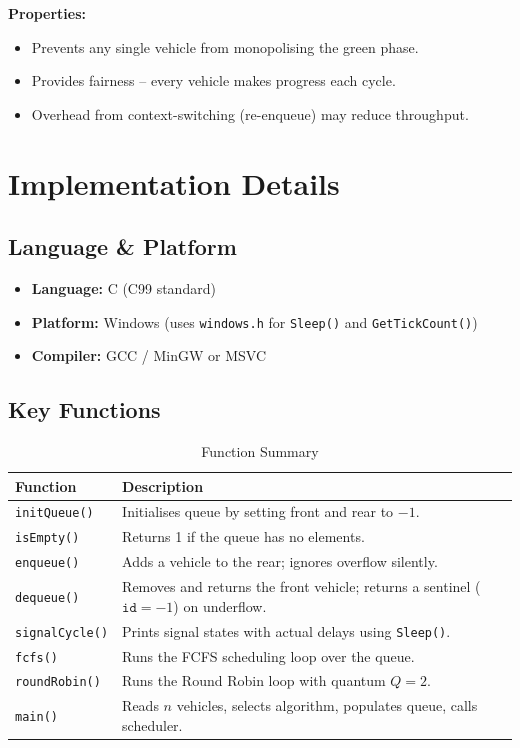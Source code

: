 \documentclass[12pt,a4paper]{article}
\begin{document}
\textbf{Properties:}
\begin{itemize}
    \item Prevents any single vehicle from monopolising the green phase.
    \item Provides fairness -- every vehicle makes progress each cycle.
    \item Overhead from context-switching (re-enqueue) may reduce throughput.
\end{itemize}

\newpage

\section{Implementation Details}

\subsection{Language \& Platform}
\begin{itemize}
    \item \textbf{Language:} C (C99 standard)
    \item \textbf{Platform:} Windows (uses \texttt{windows.h} for \texttt{Sleep()} and \texttt{GetTickCount()})
    \item \textbf{Compiler:} GCC / MinGW or MSVC
\end{itemize}

\subsection{Key Functions}

\begin{table}[H]
\centering
\caption{Function Summary}
\begin{tabular}{lp{8cm}}
\toprule
\textbf{Function} & \textbf{Description} \\
\midrule
\texttt{initQueue()} & Initialises queue by setting front and rear to $-1$. \\
\texttt{isEmpty()} & Returns 1 if the queue has no elements. \\
\texttt{enqueue()} & Adds a vehicle to the rear; ignores overflow silently. \\
\texttt{dequeue()} & Removes and returns the front vehicle; returns a sentinel ($\texttt{id}=-1$) on underflow. \\
\texttt{signalCycle()} & Prints signal states with actual delays using \texttt{Sleep()}. \\
\texttt{fcfs()} & Runs the FCFS scheduling loop over the queue. \\
\texttt{roundRobin()} & Runs the Round Robin loop with quantum $Q=2$. \\
\texttt{main()} & Reads $n$ vehicles, selects algorithm, populates queue, calls scheduler. \\
\bottomrule
\end{tabular}
\end{table}
\end{document}
